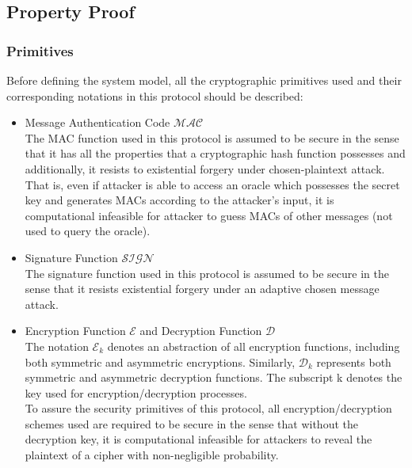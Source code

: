\subsection*{Property Proof}
\subsubsection*{Primitives}
Before defining the system model, all the cryptographic primitives used and their corresponding notations in this protocol should be described:
\begin{itemize}
\item Message Authentication Code $\mathcal{MAC}$\\
The MAC function used in this protocol is assumed to be secure in the sense that it has all the properties that a cryptographic hash function possesses and additionally, it resists to existential forgery under chosen-plaintext attack. That is, even if attacker is able to access an oracle which possesses the secret key and generates MACs according to the attacker's input, it is computational infeasible for attacker to guess MACs of other messages (not used to query the oracle).

\item Signature Function $\mathcal{SIGN}$\\
The signature function used in this protocol is assumed to be secure in the sense that it resists existential forgery under an adaptive chosen message attack. \cite{goldwasser}

\item Encryption Function $\mathcal{E}$ and Decryption Function $\mathcal{D}$\\
The notation $\mathcal{E}_k$ denotes an abstraction of all encryption functions, including both symmetric and asymmetric encryptions. Similarly, $\mathcal{D}_k$ represents both symmetric and asymmetric decryption functions. The subscript k denotes the key used for encryption/decryption processes.\\
To assure the security primitives of this protocol, all encryption/decryption schemes used are required to be secure in the sense that without the decryption key, it is computational infeasible for attackers to reveal the plaintext of a cipher with non-negligible probability.


\end{itemize}

